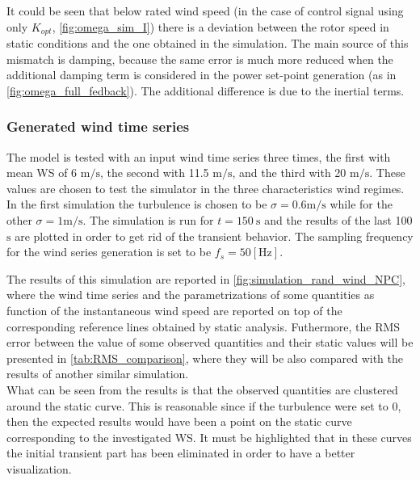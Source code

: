 

It could be seen that below rated wind speed (in the case of control signal using only $K_{opt}$, \autoref{fig:omega_sim_I}) there is a deviation between the rotor speed in static conditions and the one obtained in the simulation. The main source of this mismatch is damping, because the same error is much more reduced when the additional damping term is considered in the power set-point generation (as in \autoref{fig:omega_full_fedback}). The additional difference is due to the inertial terms. 

\subsubsection{Generated wind time series}\label{sec:wind_series_sim}
The model is tested with an input wind time series three times, the first with mean \acrshort{WS} of 6 $\si{\meter\per\second}$, the second with 11.5 $\si{\meter\per\second}$, and the third with 20 $\si{\meter\per\second}$. These values are chosen to test the simulator in the three characteristics wind regimes. In the first simulation the turbulence is chosen to be $\sigma=0.6 \si{\meter\per\second}$ while for the other $\sigma=1 \si{\meter\per\second}$. The simulation is run for $t=150\ \si{\second}$ and the results of the last 100 $\si{\second}$ are plotted in order to get rid of the transient behavior. The sampling frequency for the wind series generation is set to be $f_s=50 \left[\si{\hertz}\right]$.

The results of this simulation are reported in \autoref{fig:simulation_rand_wind_NPC}, where the wind time series and the parametrizations of some quantities as function of the instantaneous wind speed are reported on top of the corresponding reference lines obtained by static analysis. Futhermore, the \acrfull{RMS} error between the value of some observed quantities and their static values will be presented in \autoref{tab:RMS_comparison}, where they will be also compared with the results of another similar simulation. \\
What can be seen from the results is that the observed quantities are clustered around the static curve. This is reasonable since if the turbulence were set to 0, then the expected results would have been a point on the static curve corresponding to the investigated WS. It must be highlighted that in these curves the initial transient part has been eliminated in order to have a better visualization. 


